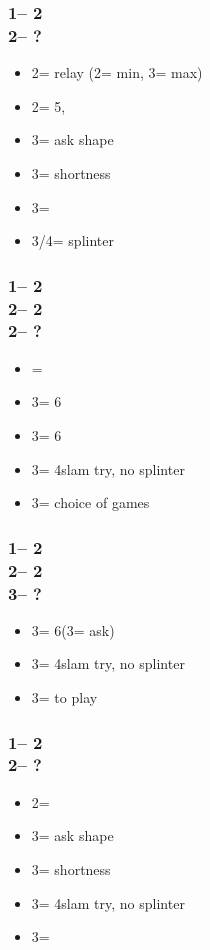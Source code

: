 \subsubsection*{1\nt -- 2\clubs\\
                2\hearts -- ?}
\begin{itemize}
    \item 2\spades = relay (2\nt = min, 3\clubs = max)
    \item 2\nt = 5\spades, \inv
    \item 3\clubs = ask shape
    \item 3\diams = \minor shortness
    \item 3\hearts = \inv
    \item 3\spades/4\minor = splinter
\end{itemize}

\subsubsection*{1\nt -- 2\clubs\\
                2\hearts -- 2\spades\\
                2\nt -- ?}
\begin{itemize}
    \item \pass = \inv\ \bal
    \item 3\clubs = 6\spades\ \inv
    \item 3\diams = 6\spades\ \inv
    \item 3\hearts = 4\hearts slam try, no splinter
    \item 3\nt = choice of games
\end{itemize}

\subsubsection*{1\nt -- 2\clubs\\
                2\hearts -- 2\spades\\
                3\clubs -- ?}
\begin{itemize}
    \item 3\diams = 6\spades (3\hearts = ask)
    \item 3\hearts = 4\hearts slam try, no splinter
    \item 3\nt = to play
\end{itemize}

\subsubsection*{1\nt -- 2\clubs\\
                2\spades -- ?}
\begin{itemize}
    \item 2\nt = \inv
    \item 3\clubs = ask shape
    \item 3\diams = \minor shortness
    \item 3\hearts = 4\spades slam try, no splinter
    \item 3\spades = \inv
\end{itemize}

